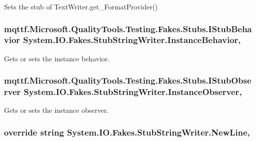Sets the stub of Text\-Writer.\-get\-\_\-\-Format\-Provider()

\hypertarget{class_system_1_1_i_o_1_1_fakes_1_1_stub_string_writer_a88bc77e70b4498c5f955aeb62c8feac5}{
\subsubsection[{Instance\-Behavior}]{\setlength{\rightskip}{0pt plus 5cm}mqttf.\-Microsoft.\-Quality\-Tools.\-Testing.\-Fakes.\-Stubs.\-I\-Stub\-Behavior System.\-I\-O.\-Fakes.\-Stub\-String\-Writer.\-Instance\-Behavior\hspace{0.3cm}{\ttfamily [get]}, {\ttfamily [set]}}}\label{class_system_1_1_i_o_1_1_fakes_1_1_stub_string_writer_a88bc77e70b4498c5f955aeb62c8feac5}


Gets or sets the instance behavior.

\hypertarget{class_system_1_1_i_o_1_1_fakes_1_1_stub_string_writer_a07f440f09c32cb60ce01a8f9f4ac59f0}{
\subsubsection[{Instance\-Observer}]{\setlength{\rightskip}{0pt plus 5cm}mqttf.\-Microsoft.\-Quality\-Tools.\-Testing.\-Fakes.\-Stubs.\-I\-Stub\-Observer System.\-I\-O.\-Fakes.\-Stub\-String\-Writer.\-Instance\-Observer\hspace{0.3cm}{\ttfamily [get]}, {\ttfamily [set]}}}\label{class_system_1_1_i_o_1_1_fakes_1_1_stub_string_writer_a07f440f09c32cb60ce01a8f9f4ac59f0}


Gets or sets the instance observer.

\hypertarget{class_system_1_1_i_o_1_1_fakes_1_1_stub_string_writer_ad979685926ff32c450b9a02836ec87db}{
\subsubsection[{New\-Line}]{\setlength{\rightskip}{0pt plus 5cm}override string System.\-I\-O.\-Fakes.\-Stub\-String\-Writer.\-New\-Line\hspace{0.3cm}{\ttfamily [get]}, {\ttfamily [set]}}}\label{class_system_1_1_i_o_1_1_fakes_1_1_stub_string_writer_ad979685926ff32c450b9a02836ec87db}


